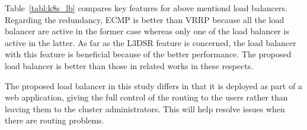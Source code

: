\begin{table}[h]
  \centering

  \par\bigskip
  \begin{minipage}{1.0\columnwidth}
    \caption[Comparison of software load balancers for Kubernetes]{
    Comparison of software load balancers for Kubernetes. 
  $^{*}$ Conventional technology uses cloud load balancers if available, which is not necessarily container friendly. 
  $^{**}$ Metallb also supports layer 2 mode, which uses unsolicited ARP or NDP packets to update layer 2 address table in the upstream router. 
  $^{***}$ The author plans to add XDP feature in future work.
    }   
    \label{tabl:k8s_lb}
  \end{minipage}

\end{table}

Table~\ref{tabl:k8s_lb} compares key features for above mentiond load balancers.
Regarding the redundancy, ECMP is better than VRRP because all the load balancer are active in the former case whereas only one of the load balancer is active in the latter.
As far as the L3DSR feature is concerned, the load balancer with this feature is beneficial because of the better performance.
The proposed load balancer is better than those in related works in these respects.

The proposed load balancer in this study differs in that it is deployed as part of a web application, giving the full control of the routing to the users rather than leaving them to the cluster administrators.
This will help resolve issues when there are routing problems.

